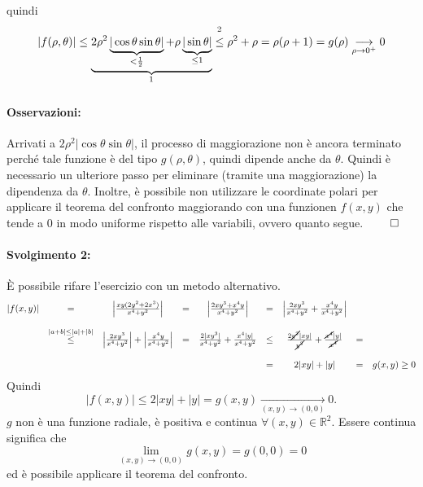 \begin{example}
	\noindent quindi
	\begin{equation*}
		|f(\rho, \theta)|\leq \underbrace{2\rho^2\underbrace{|\cos\theta\sin\theta|}_{<\frac{1}{2}} + \rho \underbrace{|\sin\theta|}_{\leq 1}}_{\footnotemark} \overset{\footnotemark}{\leq} \rho^2+\rho = \rho(\rho+1) = g(\rho)\underset{\rho\rightarrow0^+}{\longrightarrow}0
	\end{equation*}
	\addtocounter{footnote}{-1}
	\paragraph{Osservazioni:} Arrivati a $2\rho^2|\cos\theta\sin\theta|$, il processo di maggiorazione non è ancora terminato perché tale funzione è del tipo $g(\rho,\theta)$, quindi dipende anche da $\theta$. Quindi è necessario un ulteriore passo per eliminare (tramite una maggiorazione) la dipendenza da $\theta$. Inoltre, è possibile non utilizzare le coordinate polari per applicare il teorema del confronto maggiorando con una funzionen $f(x,y)$ che tende a 0 in modo uniforme rispetto alle variabili, ovvero quanto segue. $\qed$
	
	\paragraph{Svolgimento 2:} È possibile rifare l'esercizio con un metodo alternativo.
	\begin{equation*}
		\begin{matrix}
			|f(x,y)| &=& \left| \frac{xy(2y^2 + 2 x^3)}{x^4+y^2}\right| &=& \left| \frac{2xy^3 + x^4y}{x^4+y^2}\right| &=& \left|\frac{2xy^3}{x^4+y^2} + \frac{x^4y}{x^4+y^2}\right|\\\\ &\overset{|a+b|\leq|a|+|b|}{\leq}& \left|\frac{2xy^3}{x^4+y^2}\right| + \left| \frac{x^4y}{x^4+y^2}\right| &=& \frac{2|xy^3|}{x^4+y^2} + \frac{x^4|y|}{x^4+y^2} &\leq& \frac{2\cancel{y^2}|xy|}{\cancel{y^2}} +  \frac{\cancel{x^4}|y|}{\cancel{x^4}} &=&\\\\
			&&&&&=& 2|xy|+|y| &=& g(x,y) \geq 0
		\end{matrix}
	\end{equation*}
	Quindi
	\begin{equation*}
		|f(x,y)| \leq  2|xy|+|y| = g(x,y)\underset{(x,y)\rightarrow(0,0)}{\longrightarrow} 0.
	\end{equation*}
	$g$ non è una funzione radiale, è positiva e continua $\forall(x,y)\in\mathbb{R}^2$. Essere continua significa che
	\begin{equation*}
		\lim_{(x,y)\rightarrow(0,0)} g(x,y)=g(0,0)=0
	\end{equation*}
	ed è possibile applicare il teorema del confronto.
\end{example}


